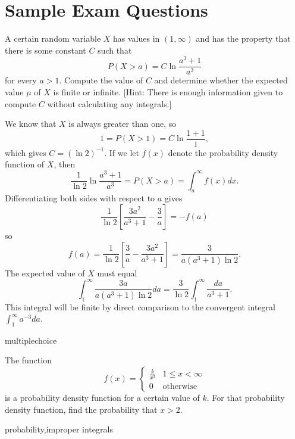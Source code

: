 \documentclass{ximera}
\begin{document}
\section*{Sample Exam Questions}

\begin{question}%
A certain random variable $X$ has values in $(1,\infty)$ and has the property that there is some constant $C$ such that
\[ P( X > a) = C \ln \frac{a^3+1}{a^3} \]
for every $a > 1$. Compute the value of $C$ and determine whether the expected value $\mu$ of $X$ is finite or infinite. [Hint: There is enough information given to compute $C$ without calculating any integrals.]
\begin{multipleChoice}
 \choicebreak
{}
\end{multipleChoice}


\begin{feedback}
We know that $X$ is always greater than one, so
\[ 1 = P(X > 1) = C \ln \frac{1+1}{1}, \]
which gives $C = (\ln 2)^{-1}$.  If we let $f(x)$ denote the probability density function of $X$, then
\[ \frac{1}{\ln 2} \ln \frac{a^3+1}{a^3} = P(X > a) = \int_a^\infty f(x) dx. \]
Differentiating both sides with respect to $a$ gives
\[ \frac{1}{\ln 2} \left[ \frac{3 a^2}{a^3+1} - \frac{3}{a} \right] = - f(a) \]
so 
\[ f(a) = \frac{1}{\ln 2} \left[ \frac{3}{a} - \frac{3a^2}{a^3+1} \right] = \frac{3}{a(a^3+1) \ln 2}. \]
The expected value of $X$ must equal
\[ \int_1^\infty \frac{3a}{a(a^3+1) \ln 2} da = \frac{3}{\ln 2} \int_1^\infty \frac{da}{a^3+1}. \]
This integral will be finite by direct comparison to the convergent integral $\int_1^\infty a^{-3} da$.
\end{feedback}
\end{question}

\begin{question}[2015C.08]
\begin{type}
multiplechoice
\end{type}
The function 
\[ f(x) = \begin{cases} \displaystyle \frac{k}{x^3} & 1 \leq x < \infty \\ 0 & \text{otherwise} \end{cases} \]
is a probability density function for a certain value of \(k\). For that probability density function, find the probability that \(x > 2\).
\begin{multiplechoice}
\end{multiplechoice}
\begin{keywords}
probability,improper integrals
\end{keywords}
\end{question}
\end{document}
